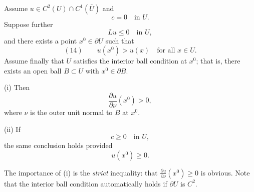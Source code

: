 \begin{lemma}
\label{lem:hopfs-lemma}
Assume $u \in C^2(U) \cap C^1(\bar U)$ and
$$c = 0 \quad \text{in } U.$$
Suppose further
$$Lu \leq 0 \quad \text{in } U,$$
and there exists a point $x^0 \in \partial U$ such that
$$(14) \qquad u(x^0) > u(x) \quad \text{for all } x \in U.$$
Assume finally that $U$ satisfies the interior ball condition at $x^0$; that is, there exists an open ball $B \subset U$ with $x^0 \in \partial B$.

(i) Then
$$\frac{\partial u}{\partial\nu}(x^0) > 0,$$
where $\nu$ is the outer unit normal to $B$ at $x^0$.

(ii) If
$$c \geq 0 \quad \text{in } U,$$
the same conclusion holds provided
$$u(x^0) \geq 0.$$
\end{lemma}

\begin{remark}
\label{rem:hopfs-lemma-strict-inequality}
The importance of (i) is the \textit{strict} inequality: that $\frac{\partial u}{\partial\nu}(x^0) \geq 0$ is obvious. Note that the interior ball condition automatically holds if $\partial U$ is $C^2$.
\end{remark}

